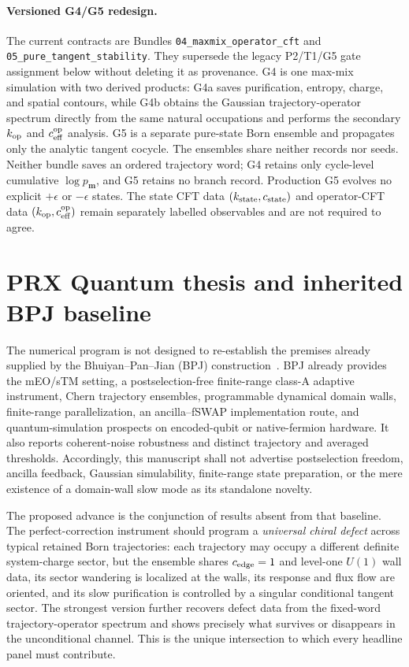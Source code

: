 \documentclass[aps,prx,twocolumn,floatfix,nofootinbib,superscriptaddress,longbibliography]{revtex4-2}
\newcommand{\code}[1]{\texttt{#1}}
\begin{document}
\paragraph*{Versioned G4/G5 redesign.}
The current contracts are Bundles \code{04\_maxmix\_operator\_cft} and
\code{05\_pure\_tangent\_stability}.  They supersede the legacy P2/T1/G5 gate assignment
below without deleting it as provenance.  G4 is one max-mix simulation with two derived
products: G4a saves purification, entropy, charge, and spatial contours, while G4b obtains
the Gaussian trajectory-operator spectrum directly from the same natural occupations and
performs the secondary $k_{\rm op}$ and $c_{\rm eff}^{\rm op}$ analysis.  G5 is a separate
pure-state Born ensemble and propagates only the analytic tangent cocycle.  The ensembles
share neither records nor seeds.  Neither bundle saves an ordered trajectory word; G4
retains only cycle-level cumulative $\log p_{\boldsymbol m}$, and G5 retains no branch
record.  Production G5 evolves no explicit $+\epsilon$ or $-\epsilon$ states.  The state
CFT data $(k_{\rm state},c_{\rm state})$ and operator-CFT data
$(k_{\rm op},c_{\rm eff}^{\rm op})$ remain separately labelled observables and are not
required to agree.

\section{PRX Quantum thesis and inherited BPJ baseline}

The numerical program is not designed to re-establish the premises already supplied by
the Bhuiyan--Pan--Jian (BPJ) construction~\cite{BhuiyanPanJian2026}.  BPJ already provides the mEO/sTM setting, a
postselection-free finite-range class-A adaptive instrument, Chern trajectory ensembles,
programmable dynamical domain walls, finite-range parallelization, an ancilla--fSWAP
implementation route, and quantum-simulation prospects on encoded-qubit or native-fermion
hardware.  It also reports coherent-noise robustness and distinct trajectory and averaged
thresholds.  Accordingly, this manuscript shall not advertise postselection freedom,
ancilla feedback, Gaussian simulability, finite-range state preparation, or the mere
existence of a domain-wall slow mode as its standalone novelty.

The proposed advance is the conjunction of results absent from that baseline.  The
perfect-correction instrument should program a \emph{universal chiral defect} across
typical retained Born trajectories: each trajectory may occupy a different definite
system-charge sector, but the ensemble shares $c_{\rm edge}=1$ and level-one $U(1)$ wall data,
its sector wandering is localized at the walls, its response and flux flow are oriented,
and its slow purification is controlled by a singular conditional tangent sector.  The
strongest version further recovers defect data from the fixed-word trajectory-operator
spectrum and shows
precisely what survives or disappears in the unconditional channel.  This is the unique
intersection to which every headline panel must contribute.
\end{document}
